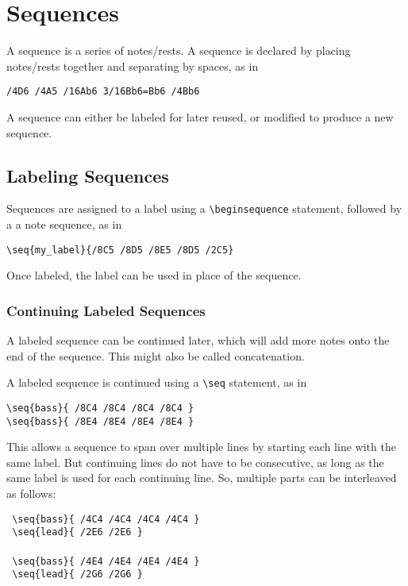 \documentclass{scrartcl}
\begin{document}
\section{Sequences}
A sequence is a series of notes/rests. A sequence is declared by placing notes/rests together and separating by spaces, as in 
\begin{tabbing}
  \hspace{0.5in}\= \verb|/4D6 /4A5 /16Ab6 3/16Bb6=Bb6 /4Bb6|
\end{tabbing}

A sequence can either be labeled for later reused, or modified to produce a new sequence.

\subsection{Labeling Sequences}
Sequences are assigned to a label using a \verb|\beginsequence| statement, followed by a a note sequence, as in
\begin{tabbing}
  \hspace{0.5in}\= \verb|\seq{my_label}{/8C5 /8D5 /8E5 /8D5 /2C5}|
\end{tabbing}

Once labeled, the label can be used in place of the sequence. 

\subsubsection{Continuing Labeled Sequences}
A labeled sequence can be continued later, which will add more notes onto the end of the sequence. This might also be called concatenation.

A labeled sequence is continued using a \verb|\seq| statement, as in
\begin{tabbing}
  \hspace{0.5in}\= \verb|\seq{bass}{ /8C4 /8C4 /8C4 /8C4 }| \\
  \> \verb|\seq{bass}{ /8E4 /8E4 /8E4 /8E4 }|
\end{tabbing}

This allows a sequence to span over multiple lines by starting each line with the same label. But continuing lines do not have to be consecutive, as long as the same label is used for each continuing line. So, multiple parts can be interleaved as follows:
\begin{tabbing}
  \hspace{1in}\= \verb| \seq{bass}{ /4C4 /4C4 /4C4 /4C4 }| \\
  \> \verb| \seq{lead}{ /2E6 /2E6 }| \\
  \> ~\\
  \> \verb| \seq{bass}{ /4E4 /4E4 /4E4 /4E4 }| \\
  \> \verb| \seq{lead}{ /2G6 /2G6 }| \\
\end{tabbing}
\end{document}
